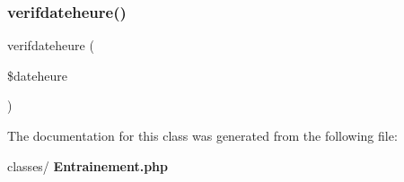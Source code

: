 \subsubsection{verifdateheure()}
{\footnotesize\ttfamily verifdateheure (\begin{DoxyParamCaption}\item[{}]{\$dateheure }\end{DoxyParamCaption})}



The documentation for this class was generated from the following file\+:\begin{DoxyCompactItemize}
\item 
classes/\textbf{ Entrainement.\+php}\end{DoxyCompactItemize}
